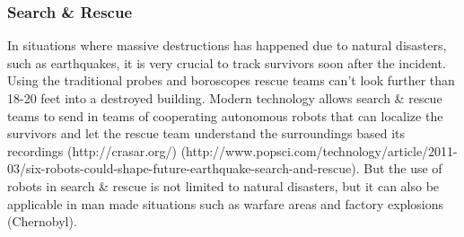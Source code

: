 \subsubsection{Search \& Rescue}
In situations where massive destructions has happened due to natural disasters, such as earthquakes, it is very crucial to track survivors soon after the incident. Using the traditional probes and boroscopes rescue teams can't look further than 18-20 feet into a destroyed building. Modern technology allows search \& rescue teams to send in teams of cooperating autonomous robots that can localize the survivors and let the rescue team understand the surroundings based its recordings (http://crasar.org/) (http://www.popsci.com/technology/article/2011-03/six-robots-could-shape-future-earthquake-search-and-rescue). 
But the use of robots in search \& rescue is not limited to natural disasters, but it can also be applicable in man made situations such as warfare areas and factory explosions (Chernobyl).

